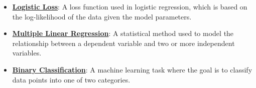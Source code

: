 \documentclass{article}%
\begin{document}
\begin{itemize}[leftmargin=*]
\item \href{https://purdue.brightspace.com/d2l/common/assets/pdfjs-d2l-dist/1.0.14-legacy/web/viewer.html?file=%2Fcontent%2Fenforced%2F1095467-wl.202510.CS.24300.001%2F05L2-ML Basics.pdf%3Fou%3D1095467&lang=en-us&container=d2l-fileviewer-rendered-pdf&fullscreen=d2l-fileviewer-rendered-pdf-dialog&height=667#page=27}{\textbf{Logistic Loss}}: A loss function used in logistic regression, which is based on the log-likelihood of the data given the model parameters.%
\item \href{https://purdue.brightspace.com/d2l/common/assets/pdfjs-d2l-dist/1.0.14-legacy/web/viewer.html?file=%2Fcontent%2Fenforced%2F1095467-wl.202510.CS.24300.001%2F05L2-ML Basics.pdf%3Fou%3D1095467&lang=en-us&container=d2l-fileviewer-rendered-pdf&fullscreen=d2l-fileviewer-rendered-pdf-dialog&height=667#page=11}{\textbf{Multiple Linear Regression}}: A statistical method used to model the relationship between a dependent variable and two or more independent variables.%
\item \href{https://purdue.brightspace.com/d2l/common/assets/pdfjs-d2l-dist/1.0.14-legacy/web/viewer.html?file=%2Fcontent%2Fenforced%2F1095467-wl.202510.CS.24300.001%2F05L2-ML Basics.pdf%3Fou%3D1095467&lang=en-us&container=d2l-fileviewer-rendered-pdf&fullscreen=d2l-fileviewer-rendered-pdf-dialog&height=667#page=20}{\textbf{Binary Classification}}: A machine learning task where the goal is to classify data points into one of two categories.%
\end{itemize}%
\end{document}

